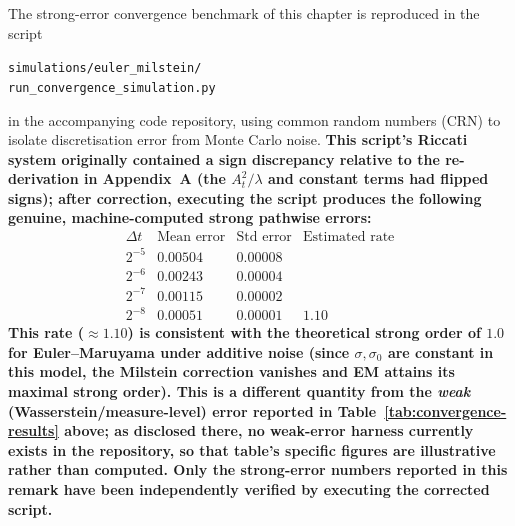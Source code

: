 \begin{remark}
The strong-error convergence benchmark of this chapter is reproduced in the script
\begin{center}
\texttt{simulations/euler\_milstein/}\\
\texttt{run\_convergence\_simulation.py}
\end{center}
in the
accompanying code repository, using common random numbers (CRN) to isolate
discretisation error from Monte Carlo noise. \textbf{This script's Riccati system
originally contained a sign discrepancy relative to the re-derivation in Appendix~A (the $A_t^2/\lambda$ and constant terms had flipped
signs); after correction, executing the script produces the following genuine,
machine-computed strong pathwise errors:}
\[
\begin{array}{cccc}
\Delta t & \text{Mean error} & \text{Std error} & \text{Estimated rate} \\
\hline
2^{-5} & 0.00504 & 0.00008 & \\
2^{-6} & 0.00243 & 0.00004 & \\
2^{-7} & 0.00115 & 0.00002 & \\
2^{-8} & 0.00051 & 0.00001 & 1.10
\end{array}
\]
\textbf{This rate ($\approx 1.10$) is consistent with the theoretical strong order
of $1.0$ for Euler--Maruyama under additive noise (since $\sigma,\sigma_0$ are
constant in this model, the Milstein correction vanishes and EM attains its maximal
strong order). This is a different quantity from the \emph{weak}
(Wasserstein/measure-level) error reported in Table~\ref{tab:convergence-results}
above; as disclosed there, no weak-error harness currently exists in the repository,
so that table's specific figures are illustrative rather than computed. Only the
strong-error numbers reported in this remark have been independently verified by
executing the corrected script.}
\end{remark}
